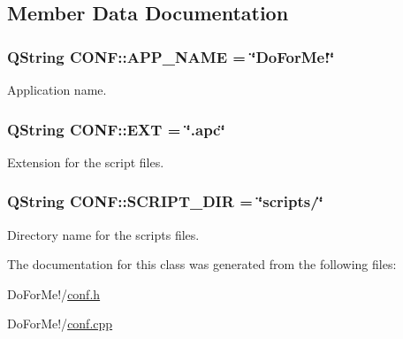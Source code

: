 \subsection{Member Data Documentation}
\hypertarget{struct_c_o_n_f_a853a9ddc60b4267b40e436f0d990bea0}{
\subsubsection[{A\-P\-P\-\_\-\-N\-A\-M\-E}]{\setlength{\rightskip}{0pt plus 5cm}Q\-String C\-O\-N\-F\-::\-A\-P\-P\-\_\-\-N\-A\-M\-E = \char`\"{}Do\-For\-Me!\char`\"{}\hspace{0.3cm}{\ttfamily [static]}}}\label{struct_c_o_n_f_a853a9ddc60b4267b40e436f0d990bea0}


Application name. 

\hypertarget{struct_c_o_n_f_a341328f597b1f2990733b7ac30a8cb88}{
\subsubsection[{E\-X\-T}]{\setlength{\rightskip}{0pt plus 5cm}Q\-String C\-O\-N\-F\-::\-E\-X\-T = \char`\"{}.apc\char`\"{}\hspace{0.3cm}{\ttfamily [static]}}}\label{struct_c_o_n_f_a341328f597b1f2990733b7ac30a8cb88}


Extension for the script files. 

\hypertarget{struct_c_o_n_f_a28e3d7259ab1d7c0415d7e8cf48a76bd}{
\subsubsection[{S\-C\-R\-I\-P\-T\-\_\-\-D\-I\-R}]{\setlength{\rightskip}{0pt plus 5cm}Q\-String C\-O\-N\-F\-::\-S\-C\-R\-I\-P\-T\-\_\-\-D\-I\-R = \char`\"{}scripts/\char`\"{}\hspace{0.3cm}{\ttfamily [static]}}}\label{struct_c_o_n_f_a28e3d7259ab1d7c0415d7e8cf48a76bd}


Directory name for the scripts files. 



The documentation for this class was generated from the following files\-:\begin{DoxyCompactItemize}
\item 
Do\-For\-Me!/\hyperlink{conf_8h}{conf.\-h}\item 
Do\-For\-Me!/\hyperlink{conf_8cpp}{conf.\-cpp}\end{DoxyCompactItemize}
